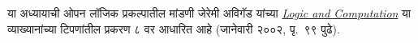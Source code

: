 \documentclass[../../../include/open-logic-chapter]{subfiles}
\begin{document}

या अध्यायाची ओपन लॉजिक प्रकल्पातील मांडणी जेरेमी अविगॅड यांच्या \href{https://www.andrew.cmu.edu/user/avigad/Teaching/landc_notes.pdf#page=105}{\emph{Logic and Computation}} या व्याख्यानांच्या टिपणांतील प्रकरण ८ वर आधारित आहे (जानेवारी २००२, पृ.~९९ पुढे).















\OLEndChapterHook
\end{document}
